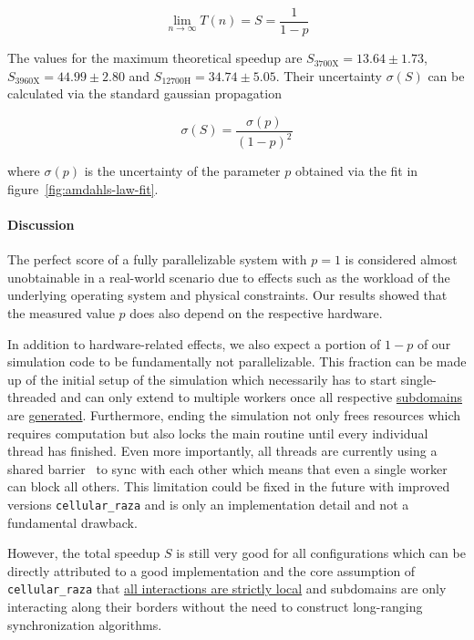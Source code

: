 \documentclass[fontsize=11pt,a4paper]{article}
\begin{document}
\begin{equation}
    \lim\limits_{n\rightarrow\infty} T(n) = S = \frac{1}{1-p}
    \label{eq:amdahls-law-maximum-speedup}
\end{equation}

The values for the maximum theoretical speedup are $S_\text{3700X}=13.64\pm1.73$,
$S_\text{3960X}=44.99\pm2.80$ and $S_\text{12700H}=34.74\pm5.05$.
Their uncertainty $\sigma(S)$ can be calculated via the standard gaussian propagation

\begin{equation}
    \sigma(S) = \frac{\sigma(p)}{(1-p)^2}
\end{equation}

where $\sigma(p)$ is the uncertainty of the parameter $p$ obtained via the fit in
figure~\ref{fig:amdahls-law-fit}.

\paragraph{Discussion}
The perfect score of a fully parallelizable system with $p=1$ is considered almost unobtainable
in a real-world scenario due to effects such as the workload of the underlying operating system
and physical constraints.
Our results showed that the measured value $p$ does also depend on the respective hardware.

In addition to hardware-related effects, we also expect a portion of $1-p$ of our simulation code
to be fundamentally not parallelizable.
This fraction can be made up of the initial setup of the simulation which necessarily has to start
single-threaded and can only extend to multiple workers once all respective
\href{https://cellular-raza.com/docs/cellular_raza_core/backend/chili/struct.SubDomainBox.html}
{subdomains} are
\href{https://cellular-raza.com/docs/cellular_raza_concepts/trait.Domain.html}{generated}.
Furthermore, ending the simulation not only frees resources which requires computation but also
locks the main routine until every individual thread has finished.
Even more importantly, all threads are currently using a shared barrier~\cite{GjengsetHurdles2018}
to sync with each other which means that even a single worker can block all others.
This limitation could be fixed in the future with improved versions \texttt{cellular\_raza} and is
only an implementation detail and not a fundamental drawback.

However, the total speedup $S$ is still very good for all configurations which can be directly
attributed to a good implementation and the core assumption of \texttt{cellular\_raza} that
\href{https://cellular-raza.com/guides/introduction/#local-rules}
{all interactions are strictly local} and subdomains are only interacting along their borders
without the need to construct long-ranging synchronization algorithms.
\end{document}
